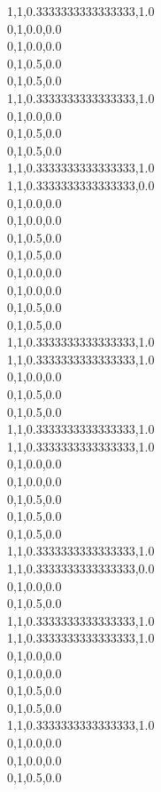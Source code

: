 1,1,0.3333333333333333,1.0\\
0,1,0.0,0.0\\
0,1,0.0,0.0\\
0,1,0.5,0.0\\
0,1,0.5,0.0\\
1,1,0.3333333333333333,1.0\\
0,1,0.0,0.0\\
0,1,0.5,0.0\\
0,1,0.5,0.0\\
1,1,0.3333333333333333,1.0\\
1,1,0.3333333333333333,0.0\\
0,1,0.0,0.0\\
0,1,0.0,0.0\\
0,1,0.5,0.0\\
0,1,0.5,0.0\\
0,1,0.0,0.0\\
0,1,0.0,0.0\\
0,1,0.5,0.0\\
0,1,0.5,0.0\\
1,1,0.3333333333333333,1.0\\
1,1,0.3333333333333333,1.0\\
0,1,0.0,0.0\\
0,1,0.5,0.0\\
0,1,0.5,0.0\\
1,1,0.3333333333333333,1.0\\
1,1,0.3333333333333333,1.0\\
0,1,0.0,0.0\\
0,1,0.0,0.0\\
0,1,0.5,0.0\\
0,1,0.5,0.0\\
0,1,0.5,0.0\\
1,1,0.3333333333333333,1.0\\
1,1,0.3333333333333333,0.0\\
0,1,0.0,0.0\\
0,1,0.5,0.0\\
1,1,0.3333333333333333,1.0\\
1,1,0.3333333333333333,1.0\\
0,1,0.0,0.0\\
0,1,0.0,0.0\\
0,1,0.5,0.0\\
0,1,0.5,0.0\\
1,1,0.3333333333333333,1.0\\
0,1,0.0,0.0\\
0,1,0.0,0.0\\
0,1,0.5,0.0\\
